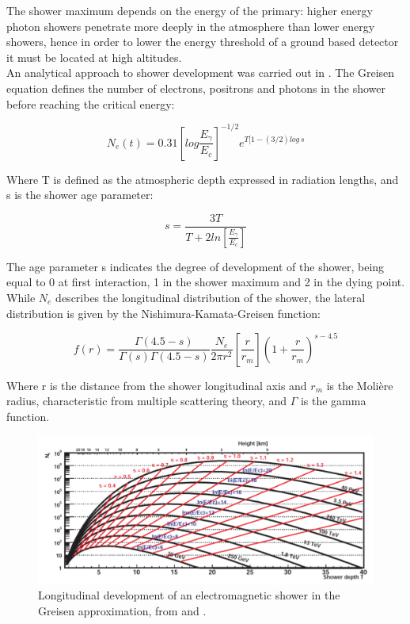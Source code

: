 \documentclass[main.tex]{subfiles}
\begin{document}
The shower maximum depends on the energy of the primary: higher energy photon showers penetrate more deeply in the atmosphere than lower energy showers, hence in order to lower the energy threshold of a ground based detector it must be located at high altitudes.\\
An analytical approach to shower development was carried out in \cite{RossiGreisenCR}. The Greisen equation defines the number of electrons, positrons and photons in the shower before reaching the critical energy:

\begin{equation}
    N_{e}(t) = 0.31 \left[log \frac{E_{\gamma}}{E_{c}}\right]^{-1/2} e^{T[1-(3/2)log\,s}
\end{equation}

Where T is defined as the atmospheric depth expressed in radiation lengths, and s is the shower age parameter:

\begin{equation}
    s = \frac{3T}{T+2ln \left[\frac{E_{\gamma}}{E_c}\right]}
\end{equation}

The age parameter s indicates the degree of development of the shower, being equal to 0  at first interaction, 1 in the shower maximum and 2 in the dying point. \\
While $N_{e}$ describes the longitudinal distribution of the shower, the lateral distribution is given by the Nishimura-Kamata-Greisen function: 

\begin{equation}
    f(r) = \frac{\Gamma(4.5-s)}{\Gamma(s)\Gamma(4.5-s)} \frac{N_e}{2\pi r^2}\left[\frac{r}{r_m} \right] \left( 1+\frac{r}{r_m} \right)^{s-4.5}
\end{equation}

Where r is the distance from the shower longitudinal axis and $r_{m}$ is the Molière radius, characteristic from multiple scattering theory,  and $\Gamma$ is the gamma function. 

\begin{figure}[h]
    \centering
    \includegraphics[width=1\textwidth]{Pictures/showerdevelop.pdf}
    \caption{Longitudinal development of an electromagnetic shower in the Greisen approximation, from \cite{IOyaThesis} and \cite{TarekThesis}.}
    \label{fig:showeredel}
\end{figure}
\end{document}

